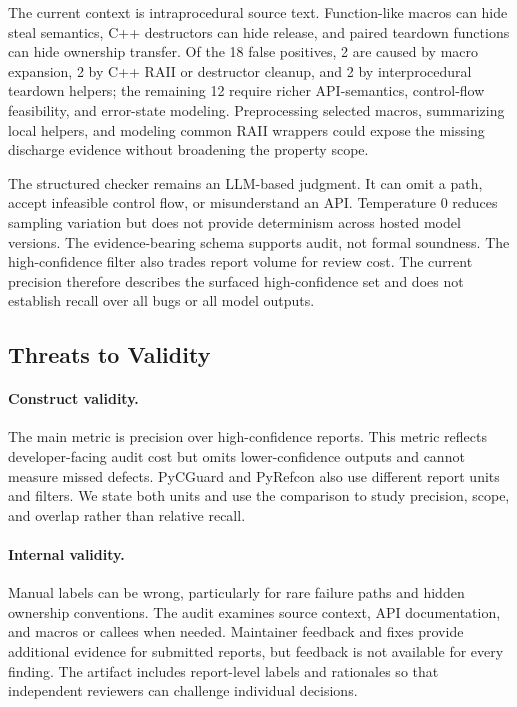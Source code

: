 The current context is intraprocedural source text. Function-like macros can
hide steal semantics, C++ destructors can hide release, and paired teardown
functions can hide ownership transfer. Of the 18 false positives, 2 are caused
by macro expansion, 2 by C++ RAII or destructor cleanup, and 2 by
interprocedural teardown helpers; the remaining 12 require richer API-semantics, control-flow
feasibility, and error-state modeling. Preprocessing selected macros,
summarizing local helpers, and modeling common RAII wrappers could expose the
missing discharge evidence without broadening the property scope.

The structured checker remains an LLM-based judgment. It can omit a path,
accept infeasible control flow, or misunderstand an API. Temperature 0 reduces
sampling variation but does not provide determinism across hosted model
versions. The evidence-bearing schema supports audit, not formal soundness.
The high-confidence filter also trades report volume for review cost. The
current precision therefore describes the surfaced high-confidence set and
does not establish recall over all bugs or all model outputs.

\subsection{Threats to Validity}

\paragraph{Construct validity.}
The main metric is precision over high-confidence reports. This metric reflects
developer-facing audit cost but omits lower-confidence outputs and cannot
measure missed defects. PyCGuard and PyRefcon also use different report units
and filters. We state both units and use the comparison to study precision,
scope, and overlap rather than relative recall.

\paragraph{Internal validity.}
Manual labels can be wrong, particularly for rare failure paths and hidden
ownership conventions. The audit examines source context, API documentation,
and macros or callees when needed. Maintainer feedback and fixes provide
additional evidence for submitted reports, but feedback is not available for
every finding. The artifact includes report-level labels and
rationales so that independent reviewers can challenge individual decisions.

